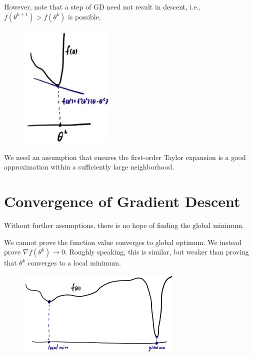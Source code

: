 However, note that a step of GD need not result in descent, i.e., $f\left(\theta^{k+1}\right)>f\left(\theta^{k}\right)$ is possible.

\begin{figure}[H]
    \centering
    \includegraphics[width=0.4\textwidth]{.././assets/2.1.png}
\end{figure}

We need an assumption that ensures the first-order Taylor expansion is a good approximation within a sufficiently large neighborhood.

\section{Convergence of Gradient Descent}

Without further assumptions, there is no hope of finding the global minimum.

We cannot prove the function value converges to global optimum. We instead prove $\nabla f\left(\theta^{k}\right) \rightarrow 0$. Roughly speaking, this is similar, but weaker than proving that $\theta^{k}$ converges to a local minimum.

\begin{figure}[H]
    \centering
    \includegraphics[width=0.7\textwidth]{.././assets/2.2.png}
\end{figure}


